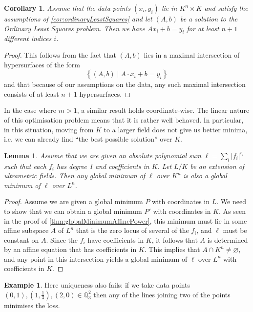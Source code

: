\documentclass[10pt]{article}
\newtheorem{corollary}[theorem]{Corollary}
\newtheorem{lemma}[theorem]{Lemma}
\theoremstyle{definition}
\newtheorem{example}[theorem]{Example}
\newcommand{\QQ}{\mathbb{Q}}
\begin{document}
\begin{corollary}
    Assume that the data points $(x_i, y_i)$ lie in $K ^ n \times K$ and satisfy the assumptions of \cref{cor:ordinaryLeastSquares} and let $(A, b)$ be a solution to the Ordinary Least Squares problem. Then we have $A x_i + b = y_i$ for at least $n+1$ different indices $i$.
\end{corollary}

\begin{proof}
    This follows from the fact that $(A, b)$ lies in a maximal intersection of hypersurfaces of the form
    $$
        \left\{ (A, b) \mid A \cdot x_i + b = y_i \right\}
    $$
    and that because of our assumptions on the data, any such maximal intersection consists of at least $n+1$ hypersurfaces.
\end{proof}

In the case where $m  > 1$, a similar result holds coordinate-wise.
The linear nature of this optimisation problem means that it is rather well behaved. In particular, in this situation, moving from $K$ to a larger field does not give us better minima, i.e. we can already find ``the best possible solution'' over $K$.

\begin{lemma}
    Assume that we are given an absolute polynomial sum $\ell = \sum_i |f_i|^{r_i}$ such that each $f_i$ has degree 1 and coefficients in $K$. Let $L/K$ be an extension of ultrametric fields. Then any global minimum of $\ell$ over $K^n$ is also a global minimum of $\ell$ over $L^n$.
\end{lemma}

\begin{proof}
    Assume we are given a global minimum $P$ with coordinates in $L$. We need to show that we can obtain a global minimum $P'$ with coordinates in $K$. As seen in the proof of \cref{thm:globalMinimumAffinePower}, this minimum must lie in some affine subspace $A$ of $L ^ {n}$ that is the zero locus of several of the $f_i$, and $\ell$ must be constant on $A$. Since the $f_i$ have coefficients in $K$, it follows that $A$ is determined by an affine equation that has coefficients in $K$. This implies that $A \cap K^n \ne \varnothing$, and any point in this intersection yields a global minimum of $\ell$ over $L ^ n$ with coefficients in $K$.
\end{proof}

\begin{example}
    Here uniqueness also fails: if we take data points $(0, 1), (1, \frac{1}{3}), (2, 0) \in \QQ_3^2$ then any of the lines joining two of the points minimises the loss.
\end{example}
\end{document}
